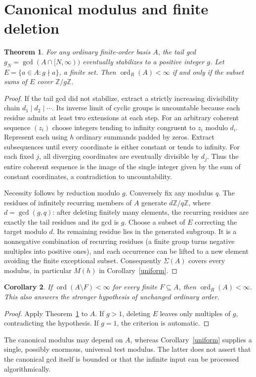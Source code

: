 \documentclass[11pt]{article}
\newtheorem{theorem}{Theorem}[section]
\newtheorem{corollary}[theorem]{Corollary}
\theoremstyle{remark}\newtheorem{remark}[theorem]{Remark}
\newcommand{\Z}{\mathbb Z}
\newcommand{\ord}{\operatorname{ord}}
\newcommand{\ordR}{\operatorname{ord}_{R}}
\begin{document}
\section{Canonical modulus and finite deletion}
\begin{theorem}\label{canonical}
For any ordinary finite-order basis $A$, the tail gcd $g_N=\gcd(A\cap[N,\infty))$ eventually stabilizes to a positive integer $g$. Let $E=\{a\in A:g\nmid a\}$, a finite set. Then $\ordR(A)<\infty$ if and only if the subset sums of $E$ cover $\Z/g\Z$.
\end{theorem}
\begin{proof}
If the tail gcd did not stabilize, extract a strictly increasing divisibility chain $d_1\mid d_2\mid\cdots$. Its inverse limit of cyclic groups is uncountable because each residue admits at least two extensions at each step. For an arbitrary coherent sequence $(z_i)$ choose integers tending to infinity congruent to $z_i$ modulo $d_i$. Represent each using $h$ ordinary summands padded by zeros. Extract subsequences until every coordinate is either constant or tends to infinity. For each fixed $j$, all diverging coordinates are eventually divisible by $d_j$. Thus the entire coherent sequence is the image of the single integer given by the sum of constant coordinates, a contradiction to uncountability.

Necessity follows by reduction modulo $g$. Conversely fix any modulus $q$. The residues of infinitely recurring members of $A$ generate $d\Z/q\Z$, where $d=\gcd(g,q)$: after deleting finitely many elements, the recurring residues are exactly the tail residues and its gcd is $g$. Choose a subset of $E$ correcting the target modulo $d$. Its remaining residue lies in the generated subgroup. It is a nonnegative combination of recurring residues (a finite group turns negative multiples into positive ones), and each occurrence can be lifted to a new element avoiding the finite exceptional subset. Consequently $\Sigma(A)$ covers every modulus, in particular $M(h)$ in Corollary~\ref{uniform}.
\end{proof}
\begin{corollary}
If $\ord(A\setminus F)<\infty$ for every finite $F\subseteq A$, then $\ordR(A)<\infty$. This also answers the stronger hypothesis of unchanged ordinary order.
\end{corollary}
\begin{proof}
Apply Theorem~\ref{canonical} to $A$. If $g>1$, deleting $E$ leaves only multiples of $g$, contradicting the hypothesis. If $g=1$, the criterion is automatic.
\end{proof}
The canonical modulus may depend on $A$, whereas Corollary~\ref{uniform} supplies a single, possibly enormous, universal test modulus. The latter does not assert that the canonical gcd itself is bounded or that the infinite input can be processed algorithmically.
\end{document}

